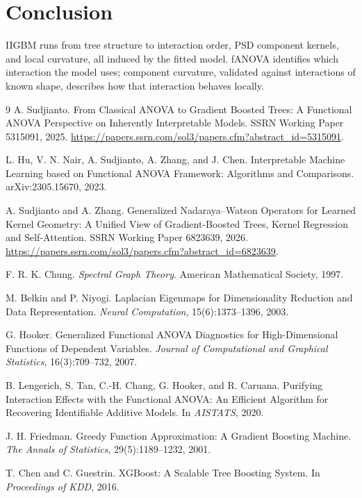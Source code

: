 \documentclass[11pt]{article}
\newcommand{\IIGBM}{\textsc{IIGBM}}
\begin{document}
\section{Conclusion}

\IIGBM{} runs from tree structure to interaction order, PSD component kernels, and
local curvature, all induced by the fitted model. fANOVA identifies which
interaction the model uses; component curvature, validated against interactions
of known shape, describes how that interaction behaves locally.

\begin{thebibliography}{9}
A. Sudjianto.
\newblock From Classical ANOVA to Gradient Boosted Trees: A Functional ANOVA
Perspective on Inherently Interpretable Models.
\newblock SSRN Working Paper 5315091, 2025.
\newblock \url{https://papers.ssrn.com/sol3/papers.cfm?abstract_id=5315091}.

L. Hu, V. N. Nair, A. Sudjianto, A. Zhang, and J. Chen.
\newblock Interpretable Machine Learning based on Functional ANOVA Framework:
Algorithms and Comparisons.
\newblock arXiv:2305.15670, 2023.

A. Sudjianto and A. Zhang.
\newblock Generalized Nadaraya--Watson Operators for Learned Kernel Geometry: A
Unified View of Gradient-Boosted Trees, Kernel Regression and Self-Attention.
\newblock SSRN Working Paper 6823639, 2026.
\newblock \url{https://papers.ssrn.com/sol3/papers.cfm?abstract_id=6823639}.

F. R. K. Chung.
\newblock \emph{Spectral Graph Theory}.
\newblock American Mathematical Society, 1997.

M. Belkin and P. Niyogi.
\newblock Laplacian Eigenmaps for Dimensionality Reduction and Data
Representation.
\newblock \emph{Neural Computation}, 15(6):1373--1396, 2003.

G. Hooker.
\newblock Generalized Functional ANOVA Diagnostics for High-Dimensional
Functions of Dependent Variables.
\newblock \emph{Journal of Computational and Graphical Statistics},
16(3):709--732, 2007.

B. Lengerich, S. Tan, C.-H. Chang, G. Hooker, and R. Caruana.
\newblock Purifying Interaction Effects with the Functional ANOVA: An Efficient
Algorithm for Recovering Identifiable Additive Models.
\newblock In \emph{AISTATS}, 2020.

J. H. Friedman.
\newblock Greedy Function Approximation: A Gradient Boosting Machine.
\newblock \emph{The Annals of Statistics}, 29(5):1189--1232, 2001.

T. Chen and C. Guestrin.
\newblock XGBoost: A Scalable Tree Boosting System.
\newblock In \emph{Proceedings of KDD}, 2016.
\end{thebibliography}
\end{document}
